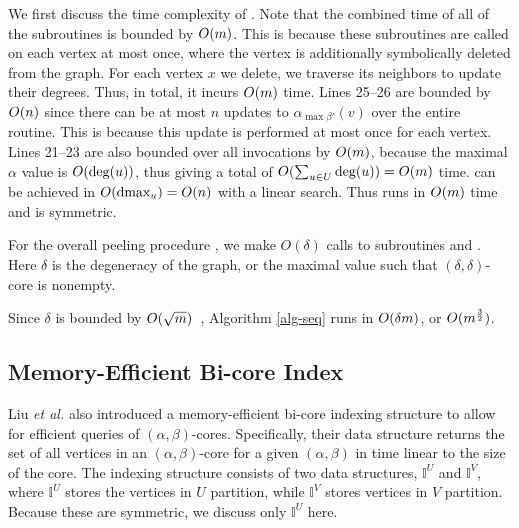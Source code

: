 We first discuss the time complexity of . Note that the combined time of all of the  subroutines is bounded by $O(m)$.
This is because these subroutines are called on each vertex at most once, where the vertex is additionally symbolically deleted from the graph.
For each vertex $x$ we delete, we traverse its neighbors to update their degrees.
Thus, in total, it incurs $O(m)$ time.
Lines 25--26 are bounded by $O(n)$ since there can be at most $n$ updates to $\alpha_{\max \beta'}(v)$ over the entire  routine. This is because this update is performed at most once for each vertex. Lines 21--23 are also bounded over all invocations by $O(m)$, because the maximal $\alpha$ value is $O(\deg(u))$, thus giving a total of $O(\sum_{u\in U} \text{deg}(u))=O(m)$ time.  can be achieved in $O(\text{dmax}_u)=O(n)$ with a linear search. Thus  runs in $O(m)$ time \cite{Liu2020Efficient} and  is symmetric.

For the overall peeling procedure , we make $O(\delta)$ calls to subroutines  and . Here $\delta$ is the degeneracy of the graph, or the maximal value such that $(\delta,\delta)$-core is nonempty.

Since $\delta$ is bounded by $O(\sqrt{m})$~\cite{Liu2020Efficient}, Algorithm \ref{alg-seq} runs in $O(\delta m)$, or $O(m^{\frac{3}{2}})$.

\subsection{Memory-Efficient Bi-core Index}\label{sec:seqindex}

Liu \textit{et al.} also introduced a memory-efficient bi-core indexing structure to allow for efficient queries of $(\alpha,\beta)$-cores. Specifically, their data structure returns the set of all vertices in an $(\alpha,\beta)$-core for a given $(\alpha, \beta)$ in time linear to the size of the core.
The indexing structure consists of two data structures, $\mathbb{I}^U$ and $\mathbb{I}^V$, where $\mathbb{I}^U$ stores the vertices in $U$ partition, while $\mathbb{I}^V$ stores vertices in $V$ partition. Because these are symmetric, we discuss only $\mathbb{I}^U$ here.


